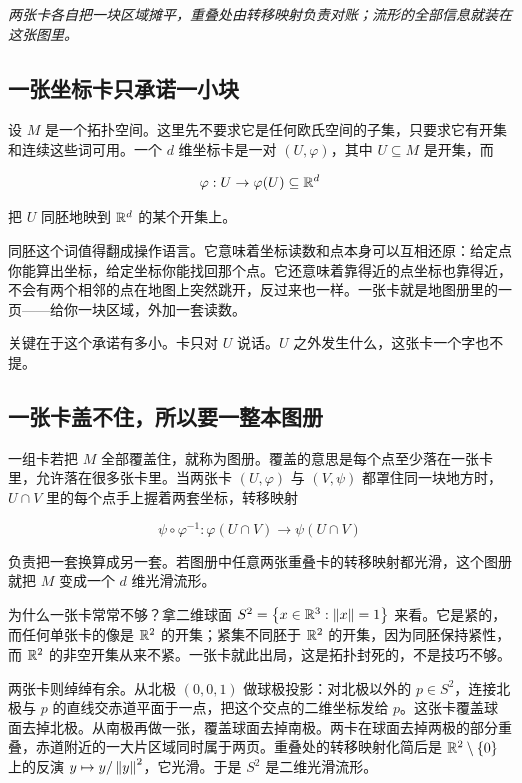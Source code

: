 \emph{两张卡各自把一块区域摊平，重叠处由转移映射负责对账；流形的全部信息就装在这张图里。}

\subsection{一张坐标卡只承诺一小块}

设 \(M\) 是一个拓扑空间。这里先不要求它是任何欧氏空间的子集，只要求它有开集和连续这些词可用。一个 \(d\) 维坐标卡是一对 \((U,\varphi)\)，其中 \(U\subseteq M\) 是开集，而

\[
\varphi:U\to\varphi(U)\subseteq\mathbb{R}^{d}
\]

把 \(U\) 同胚地映到 \(\mathbb{R}^{d}\) 的某个开集上。

同胚这个词值得翻成操作语言。它意味着坐标读数和点本身可以互相还原：给定点你能算出坐标，给定坐标你能找回那个点。它还意味着靠得近的点坐标也靠得近，不会有两个相邻的点在地图上突然跳开，反过来也一样。一张卡就是地图册里的一页——给你一块区域，外加一套读数。

关键在于这个承诺有多小。卡只对 \(U\) 说话。\(U\) 之外发生什么，这张卡一个字也不提。

\subsection{一张卡盖不住，所以要一整本图册}

一组卡若把 \(M\) 全部覆盖住，就称为图册。覆盖的意思是每个点至少落在一张卡里，允许落在很多张卡里。当两张卡 \((U,\varphi)\) 与 \((V,\psi)\) 都罩住同一块地方时，\(U\cap V\) 里的每个点手上握着两套坐标，转移映射

\[
\psi\circ\varphi^{-1}:\varphi(U\cap V)\to\psi(U\cap V)
\]

负责把一套换算成另一套。若图册中任意两张重叠卡的转移映射都光滑，这个图册就把 \(M\) 变成一个 \(d\) 维光滑流形。

为什么一张卡常常不够？拿二维球面 \(S^{2}=\left\{x\in\mathbb{R}^{3}:\left\lVert x\right\rVert=1\right\}\) 来看。它是紧的，而任何单张卡的像是 \(\mathbb{R}^{2}\) 的开集；紧集不同胚于 \(\mathbb{R}^{2}\) 的开集，因为同胚保持紧性，而 \(\mathbb{R}^{2}\) 的非空开集从来不紧。一张卡就此出局，这是拓扑封死的，不是技巧不够。

两张卡则绰绰有余。从北极 \((0,0,1)\) 做球极投影：对北极以外的 \(p\in S^{2}\)，连接北极与 \(p\) 的直线交赤道平面于一点，把这个交点的二维坐标发给 \(p\)。这张卡覆盖球面去掉北极。从南极再做一张，覆盖球面去掉南极。两卡在球面去掉两极的部分重叠，赤道附近的一大片区域同时属于两页。重叠处的转移映射化简后是 \(\mathbb{R}^{2}\setminus\left\{0\right\}\) 上的反演 \(y\mapsto y/\left\lVert y\right\rVert^{2}\)，它光滑。于是 \(S^{2}\) 是二维光滑流形。

